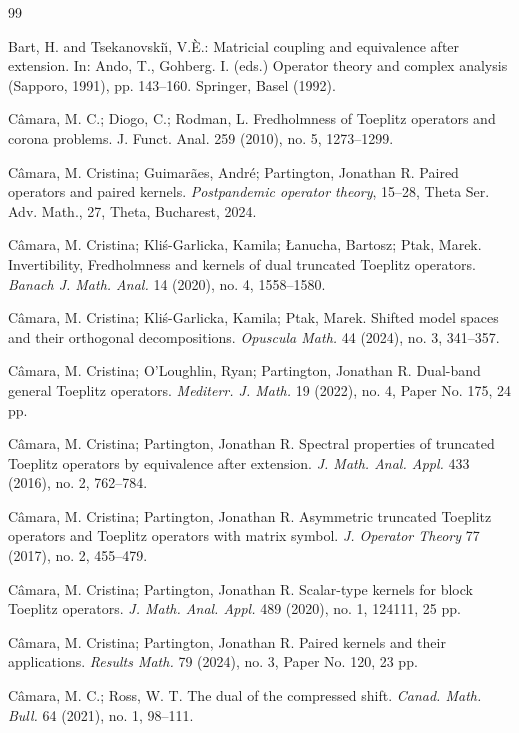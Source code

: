 \documentclass[11pt]{article}
\begin{document}
\begin{thebibliography}{99}

Bart, H. and Tsekanovski\u\i,  V.\`E.: Matricial coupling and equivalence after extension. 
In:   Ando, T., Gohberg. I. (eds.) Operator theory and complex analysis (Sapporo, 1991), 
pp. 143--160. Springer, Basel (1992).

C\^amara, M. C.; Diogo, C.; Rodman, L. Fredholmness of Toeplitz operators and corona problems. J. Funct. Anal. 259 (2010), no. 5, 1273--1299. 

C\^amara, M. Cristina; Guimar\~{a}es, Andr\'e; Partington, Jonathan R. Paired operators and paired kernels. {\em Postpandemic operator theory}, 15--28, Theta Ser. Adv. Math., 27, Theta, Bucharest, 2024.

C\^amara, M. Cristina; Kli\'s-Garlicka, Kamila; {\L}anucha, Bartosz; Ptak, Marek. Invertibility, Fredholmness and kernels of dual truncated Toeplitz operators. 
{\em Banach J. Math. Anal.} 14 (2020), no. 4, 1558--1580.

C\^amara, M. Cristina; Kli\'s-Garlicka, Kamila; Ptak, Marek. Shifted model spaces and their orthogonal decompositions. {\em Opuscula Math.} 44 (2024), no. 3, 341--357.


C\^amara, M. Cristina; O'Loughlin, Ryan; Partington, Jonathan R. Dual-band general Toeplitz operators. {\em Mediterr. J. Math.} 19 (2022), no. 4, Paper No. 175, 24 pp.

C\^amara, M. Cristina; Partington, Jonathan R. Spectral properties of truncated Toeplitz operators by equivalence after extension. {\em J. Math. Anal. Appl.} 433 (2016), no. 2, 762--784. 

C\^amara, M. Cristina; Partington, Jonathan R. Asymmetric truncated Toeplitz operators and Toeplitz operators with matrix symbol. {\em J. Operator Theory\/} 77 (2017), no. 2, 455--479.

C\^amara, M. Cristina; Partington, Jonathan R. Scalar-type kernels for block Toeplitz operators. 
{\em J. Math. Anal. Appl.} 489 (2020), no. 1, 124111, 25 pp.

C\^amara, M. Cristina; Partington, Jonathan R. Paired kernels and their applications. 
{\em Results Math.} 79 (2024), no. 3, Paper No. 120, 23 pp.

C\^amara, M. C.; Ross, W. T. The dual of the compressed shift. 
{\em Canad. Math. Bull.} 64 (2021), no. 1, 98--111.


\end{thebibliography}
\end{document}
